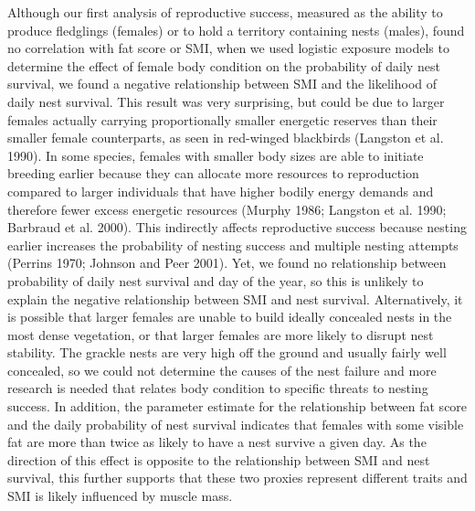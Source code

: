 \documentclass[
]{article}
\begin{document}
Although our first analysis of reproductive success, measured as the
ability to produce fledglings (females) or to hold a territory
containing nests (males), found no correlation with fat score or SMI,
when we used logistic exposure models to determine the effect of female
body condition on the probability of daily nest survival, we found a
negative relationship between SMI and the likelihood of daily nest
survival. This result was very surprising, but could be due to larger
females actually carrying proportionally smaller energetic reserves than
their smaller female counterparts, as seen in red-winged blackbirds
(Langston et al. 1990). In some species, females with smaller body sizes
are able to initiate breeding earlier because they can allocate more
resources to reproduction compared to larger individuals that have
higher bodily energy demands and therefore fewer excess energetic
resources (Murphy 1986; Langston et al. 1990; Barbraud et al. 2000).
This indirectly affects reproductive success because nesting earlier
increases the probability of nesting success and multiple nesting
attempts (Perrins 1970; Johnson and Peer 2001). Yet, we found no
relationship between probability of daily nest survival and day of the
year, so this is unlikely to explain the negative relationship between
SMI and nest survival. Alternatively, it is possible that larger females
are unable to build ideally concealed nests in the most dense
vegetation, or that larger females are more likely to disrupt nest
stability. The grackle nests are very high off the ground and usually
fairly well concealed, so we could not determine the causes of the nest
failure and more research is needed that relates body condition to
specific threats to nesting success. In addition, the parameter estimate
for the relationship between fat score and the daily probability of nest
survival indicates that females with some visible fat are more than
twice as likely to have a nest survive a given day. As the direction of
this effect is opposite to the relationship between SMI and nest
survival, this further supports that these two proxies represent
different traits and SMI is likely influenced by muscle mass.
\end{document}
